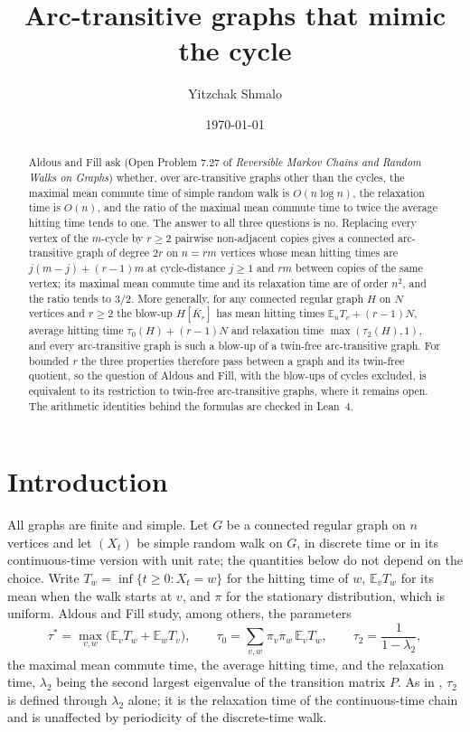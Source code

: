 \documentclass[11pt]{amsart}
\title[Arc-transitive graphs that mimic the cycle]{Arc-transitive graphs that mimic the cycle}
\author{Yitzchak Shmalo}
\date{\today}
\theoremstyle{definition}
\newcommand{\E}{\mathbb{E}}
\newcommand{\Kbar}{\overline{K}}
\begin{document}
\begin{abstract}
Aldous and Fill ask (Open Problem 7.27 of \emph{Reversible Markov Chains and Random Walks on Graphs}) whether, over arc-transitive graphs other than the cycles, the maximal mean commute time of simple random walk is $O(n\log n)$, the relaxation time is $O(n)$, and the ratio of the maximal mean commute time to twice the average hitting time tends to one. The answer to all three questions is no. Replacing every vertex of the $m$-cycle by $r\ge2$ pairwise non-adjacent copies gives a connected arc-transitive graph of degree $2r$ on $n=rm$ vertices whose mean hitting times are $j(m-j)+(r-1)m$ at cycle-distance $j\ge1$ and $rm$ between copies of the same vertex; its maximal mean commute time and its relaxation time are of order $n^2$, and the ratio tends to $3/2$. More generally, for any connected regular graph $H$ on $N$ vertices and $r\ge2$ the blow-up $H[\Kbar_r]$ has mean hitting times $\E_uT_v+(r-1)N$, average hitting time $\tau_0(H)+(r-1)N$ and relaxation time $\max(\tau_2(H),1)$, and every arc-transitive graph is such a blow-up of a twin-free arc-transitive graph. For bounded $r$ the three properties therefore pass between a graph and its twin-free quotient, so the question of Aldous and Fill, with the blow-ups of cycles excluded, is equivalent to its restriction to twin-free arc-transitive graphs, where it remains open. The arithmetic identities behind the formulas are checked in Lean~4.
\end{abstract}

\maketitle

\section{Introduction}

All graphs are finite and simple. Let $G$ be a connected regular graph on $n$ vertices and let $(X_t)$ be simple random walk on $G$, in discrete time or in its continuous-time version with unit rate; the quantities below do not depend on the choice. Write $T_w=\inf\{t\ge0:X_t=w\}$ for the hitting time of $w$, $\E_vT_w$ for its mean when the walk starts at $v$, and $\pi$ for the stationary distribution, which is uniform. Aldous and Fill \cite{AF} study, among others, the parameters
\begin{equation}\label{eq:params}
\tau^*=\max_{v,w}\big(\E_vT_w+\E_wT_v\big),\qquad
\tau_0=\sum_{v,w}\pi_v\pi_w\,\E_vT_w,\qquad
\tau_2=\frac1{1-\lambda_2},
\end{equation}
the maximal mean commute time, the average hitting time, and the relaxation time, $\lambda_2$ being the second largest eigenvalue of the transition matrix $P$. As in \cite{AF}, $\tau_2$ is defined through $\lambda_2$ alone; it is the relaxation time of the continuous-time chain and is unaffected by periodicity of the discrete-time walk.
\end{document}
